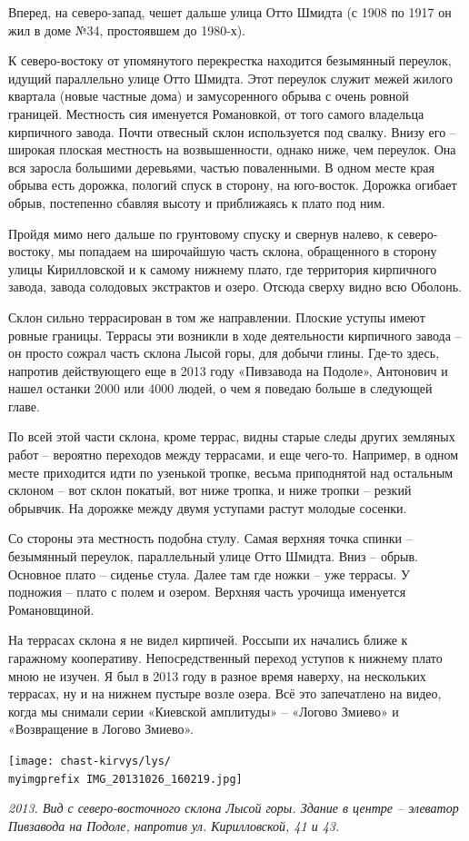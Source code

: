 Вперед, на северо-запад, чешет дальше улица Отто Шмидта (с 1908 по 1917 он жил в доме №34, простоявшем до 1980-х).

К северо-востоку от упомянутого перекрестка находится безымянный переулок, идущий параллельно улице Отто Шмидта. Этот переулок служит межей жилого квартала (новые частные дома) и замусоренного обрыва с очень ровной границей. Местность сия именуется Романовкой, от того самого владельца кирпичного завода. Почти отвесный склон используется под свалку. Внизу его – широкая плоская местность на возвышенности, однако ниже, чем переулок. Она вся заросла большими деревьями, частью поваленными. В одном месте края обрыва есть дорожка, пологий спуск в сторону, на юго-восток. Дорожка огибает обрыв, постепенно сбавляя высоту и приближаясь к плато под ним.

Пройдя мимо него дальше по грунтовому спуску и свернув налево, к северо-востоку, мы попадаем на широчайшую часть склона, обращенного в сторону улицы Кирилловской и к самому нижнему плато, где территория кирпичного завода, завода солодовых экстрактов и озеро. Отсюда сверху видно всю Оболонь.

Склон сильно террасирован в том же направлении. Плоские уступы имеют ровные границы. Террасы эти возникли в ходе деятельности кирпичного завода – он просто сожрал часть склона Лысой горы, для добычи глины. Где-то здесь, напротив действующего еще в 2013 году «Пивзавода на Подоле», Антонович и нашел останки 2000 или 4000 людей, о чем я поведаю больше в следующей главе.

По всей этой части склона, кроме террас, видны старые следы других земляных работ – вероятно переходов между террасами, и еще чего-то. Например, в одном месте приходится идти по узенькой тропке, весьма приподнятой над остальным склоном – вот склон покатый, вот ниже тропка, и ниже тропки – резкий обрывчик. На дорожке между двумя уступами растут молодые сосенки.
 
Со стороны эта местность подобна стулу. Самая верхняя точка спинки – безымянный переулок, параллельный улице Отто Шмидта. Вниз – обрыв. Основное плато – сиденье стула. Далее там где ножки – уже террасы. У подножия – плато с полем и озером. Верхняя часть урочища именуется Романовщиной.

На террасах склона я не видел кирпичей. Россыпи их начались ближе к гаражному кооперативу. Непосредственный переход уступов к нижнему плато мною не изучен. Я был в 2013 году в разное время наверху, на нескольких террасах, ну и на нижнем пустыре возле озера. Всё это запечатлено на видео, когда мы снимали серии «Киевской амплитуды» – «Логово Змиево» и «Возвращение в Логово Змиево».
\vspace*{\fill}
\begin{center}
\texttt{[image: chast-kirvys/lys/\\myimgprefix IMG\_20131026\_160219.jpg]}

\textit{2013. Вид с северо-восточного склона Лысой горы. Здание в центре – элеватор Пивзавода на Подоле, напротив ул. Кирилловской, 41 и 43.}
\end{center} 
\vspace*{\fill}
\newpage

